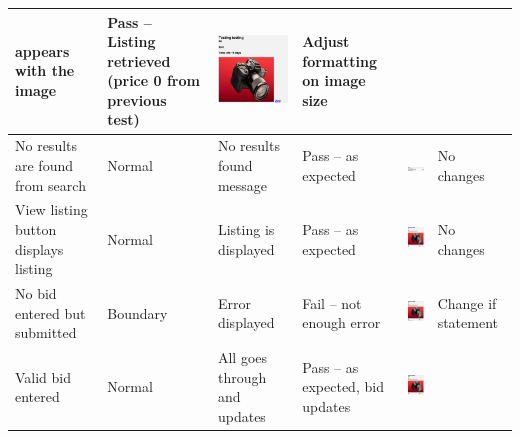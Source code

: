 \begin{center}
\begin{longtable}{|P{17mm}|P{17mm}|P{16mm}|P{17mm}|P{40mm}|P{21.5mm}|}
appears with the image & Pass -- Listing retrieved (price 0 from
previous test) &
\includegraphics[width=38mm]{ch3_developing/proto2/media/image15.png}
& Adjust formatting on image size \\ \hline
No results are found from search & Normal & No results found message &
Pass -- as expected &
\includegraphics[width=38mm]{ch3_developing/proto2/media/image16.png}
& No changes \\ \hline
View listing button displays listing & Normal & Listing is displayed &
Pass -- as expected &
\includegraphics[width=38mm]{ch3_developing/proto2/media/image17.png}
& No changes \\ \hline
No bid entered but submitted & Boundary & Error displayed & Fail -- not
enough error &
\includegraphics[width=38mm]{ch3_developing/proto2/media/image18.png}
& Change if statement \\ \hline
Valid bid entered & Normal & All goes through and updates & Pass -- as
expected, bid updates &
\includegraphics[width=38mm]{ch3_developing/proto2/media/image19.png}

\end{longtable}
\end{center}
